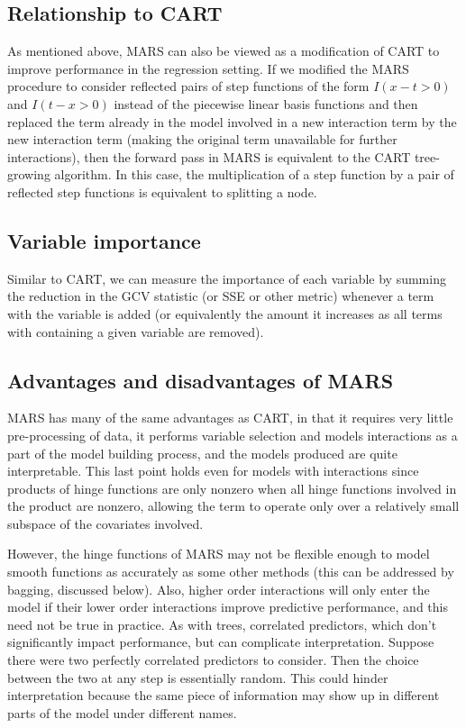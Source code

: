 \documentclass[12pt]{article}
\begin{document}
\subsection{Relationship to CART} %
\label{sub:relationship_to_cart}

As mentioned above, MARS can also be viewed as a modification of CART to improve performance in the regression setting. If we modified the MARS procedure to consider reflected pairs of step functions of the form $I(x - t > 0)$ and $I(t - x > 0)$ instead of the piecewise linear basis functions and then replaced the term already in the model involved in a new interaction term by the new interaction term (making the original term unavailable for further interactions), then the forward pass in MARS is equivalent to the CART tree-growing algorithm. In this case, the multiplication of a step function by a pair of reflected step functions is equivalent to splitting a node.


\subsection{Variable importance} %
\label{sub:variable_importance}

Similar to CART, we can measure the importance of each variable by summing the reduction in the GCV statistic (or SSE or other metric) whenever a term with the variable is added (or equivalently the amount it increases as all terms with containing a given variable are removed).


\subsection{Advantages and disadvantages of MARS} %
\label{sub:advantages_of_mars}

MARS has many of the same advantages as CART, in that it requires very little pre-processing of data, it performs variable selection and models interactions as a part of the model building process, and the models produced are quite interpretable. This last point holds even for models with interactions since products of hinge functions are only nonzero when all hinge functions involved in the product are nonzero, allowing the term to operate only over a relatively small subspace of the covariates involved.

However, the hinge functions of MARS may not be flexible enough to model smooth functions as accurately as some other methods (this can be addressed by bagging, discussed below). Also, higher order interactions will only enter the model if their lower order interactions improve predictive performance, and this need not be true in practice. As with trees, correlated predictors, which don't significantly impact performance, but can complicate interpretation. Suppose there were two perfectly correlated predictors to consider. Then the choice between the two at any step is essentially random. This could hinder interpretation because the same piece of information may show up in different parts of the model under different names.
\end{document}
